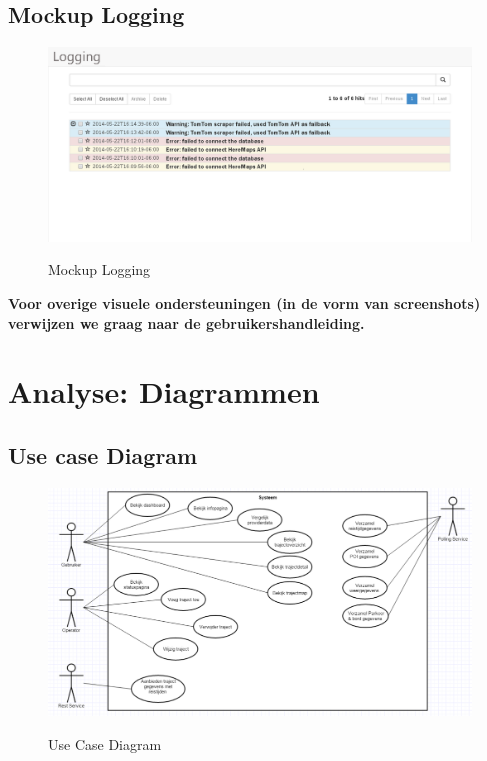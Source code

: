 \documentclass[a4paper]{article}
\begin{document}
\subsection{Mockup Logging}
\begin{figure}[H]
\centering
\includegraphics[width=\textwidth]{Images/mockuplogging.png}\\
\caption{Mockup Logging}
\end{figure}

\textbf{Voor overige visuele ondersteuningen (in de vorm van screenshots) verwijzen we graag naar de gebruikershandleiding.}

\section{Analyse: Diagrammen}

\subsection{Use case Diagram}

\begin{figure}[H]
\centering
\includegraphics[width=\textwidth]{Images/usecasediagramv3.png}\\
\caption{Use Case Diagram}
\end{figure}
\end{document}

